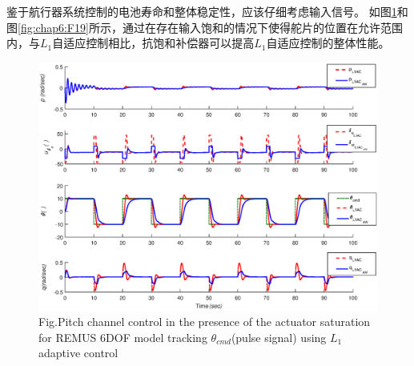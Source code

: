 鉴于航行器系统控制的电池寿命和整体稳定性，应该仔细考虑输入信号。 如图\ref{fig:chap6:F18}和图\ref{fig:chap6:F19}所示，通过在存在输入饱和的情况下使得舵片的位置在允许范围内，与$L_{1}$自适应控制相比，抗饱和补偿器可以提高$L_{1}$自适应控制的整体性能。

\begin{figure}[!htp]
 \centering
 \includegraphics[width=16cm]{figure/chap6/F6_track_10_pluse.eps}
 \label{fig:chap6:F18}
  {Fig.}{Pitch channel control in the presence of the actuator saturation for REMUS 6DOF model tracking $\theta_{cmd}$(pulse signal) using  \texorpdfstring {$L_1$}{} adaptive control}
 \end{figure}


